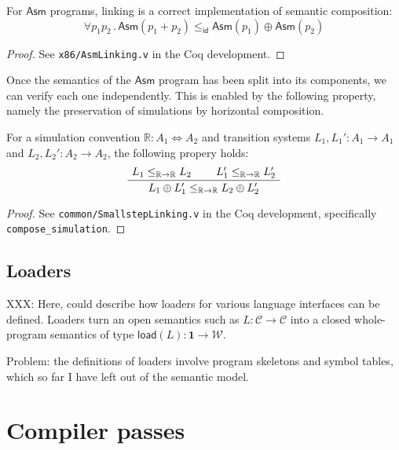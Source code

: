 \documentclass[sigplan,10pt,review,anonymous]{acmart}
\newcommand{\kw}[1]{\ensuremath{ \mathsf{#1} }}
\begin{document}
\begin{theorem} \label{thm:asmlinking} %
For \kw{Asm} programs,
linking is a correct implementation of
semantic composition:
\[
    \forall p_1 p_2 \,.\,
      \kw{Asm}(p_1 + p_2) \le_\kw{id}
      \kw{Asm}(p_1) \oplus \kw{Asm}(p_2)
\]
\begin{proof}
See \texttt{x86/AsmLinking.v} in the Coq development.
\end{proof}
\end{theorem}

Once the semantics of the \kw{Asm} program
has been split into its components,
we can verify each one independently.
This is enabled by the following property,
namely the preservation of simulations by
horizontal composition.

\begin{theorem} \label{thm:simlinking} %
For a simulation convention
$\mathbb{R} : A_1 \Leftrightarrow A_2$
and transition systems
$L_1, L_1' : A_1 \rightarrow A_1$ and
$L_2, L_2' : A_2 \rightarrow A_2$,
the following propery holds:
\[
    \AxiomC{$L_1 \le_{\mathbb{R} \rightarrow \mathbb{R}} L_2$}
    \AxiomC{$L_1' \le_{\mathbb{R} \rightarrow \mathbb{R}} L_2'$}
    \BinaryInfC{$L_1 \oplus L_1' \le_{\mathbb{R} \rightarrow \mathbb{R}} L_2 \oplus L_2'$}
    \DisplayProof
\]
\begin{proof}
See \texttt{common/SmallstepLinking.v}
in the Coq development,
specifically \texttt{compose\_simulation}.
\end{proof}
\end{theorem}


\subsection{Loaders} \label{sec:sem:loader} %

XXX: Here, could describe how loaders for various language
interfaces can be defined.
Loaders turn an open semantics such as
$L : \mathcal{C} \rightarrow \mathcal{C}$
into a closed whole-program semantics of type
$\kw{load}(L) : \mathbf{1} \rightarrow \mathcal{W}$.

Problem: the definitions of loaders involve
program skeletons and symbol tables,
which so far I have left out of the semantic model.



\section{Compiler passes} \label{sec:passes} %
\end{document}
